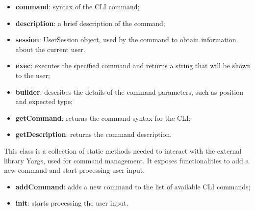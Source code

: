 					\begin{itemize}
						\item \textbf{command}: syntax of the CLI command;
						\item \textbf{description}: a brief description of the command;
						\item \textbf{session}: UserSession object, used by the command to obtain information about the current user.
					\end{itemize}
				
					\begin{itemize}
						\item \textbf{exec}: executes the specified command and returns a string that will be shown to the user;
						\item \textbf{builder}: describes the details of the command parameters, such as position and expected type;
						\item \textbf{getCommand}: returns the command syntax for the CLI;
						\item \textbf{getDescription}: returns the command description.
					\end{itemize}
	
			This class is a collection of static methods needed to interact with the external library Yargs, used for command management. It exposes functionalities to add a new command and start processing user input. 
					\begin{itemize}
						\item \textbf{addCommand}: adds a new command to the list of available CLI commands;
						\item \textbf{init}: starts processing the user input.
					\end{itemize}
			
